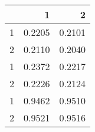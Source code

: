 \begin{tabular}{lrr}
\toprule
{} &       1 &       2 \\
\midrule
1 &  0.2205 &  0.2101 \\
2 &  0.2110 &  0.2040 \\
1 &  0.2372 &  0.2217 \\
2 &  0.2226 &  0.2124 \\
1 &  0.9462 &  0.9510 \\
2 &  0.9521 &  0.9516 \\
\bottomrule
\end{tabular}
